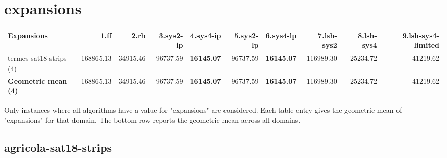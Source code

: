 \documentclass{article}
\newcommand{\numtasks}[1]{\small{(#1)}}
\begin{document}
\hypertarget{expansions}{}
\section*{expansions}

\begin{tabular}{@{}lrrrrrrrrr@{}}
Expansions & 1.ff & 2.rb & 3.sys2-ip & 4.sys4-ip & 5.sys2-lp & 6.sys4-lp & 7.lsh-sys2 & 8.lsh-sys4 & 9.lsh-sys4-limited \\
\midrule
termes-sat18-strips \numtasks{4} & 168865.13 & 34915.46 & 96737.59 & \textbf{16145.07} & 96737.59 & \textbf{16145.07} & 116989.30 & 25234.72 & 41219.62 \\
\textbf{Geometric mean \numtasks{4}} & 168865.13 & 34915.46 & 96737.59 & \textbf{16145.07} & 96737.59 & \textbf{16145.07} & 116989.30 & 25234.72 & 41219.62 \\
\end{tabular}

Only instances where all algorithms have a value for "expansions" are considered. Each table entry gives the geometric mean of "expansions" for that domain. The bottom row reports the geometric mean across all domains.

\hypertarget{expansions-agricola-sat18-strips}{}
\subsection*{agricola-sat18-strips}
\end{document}
